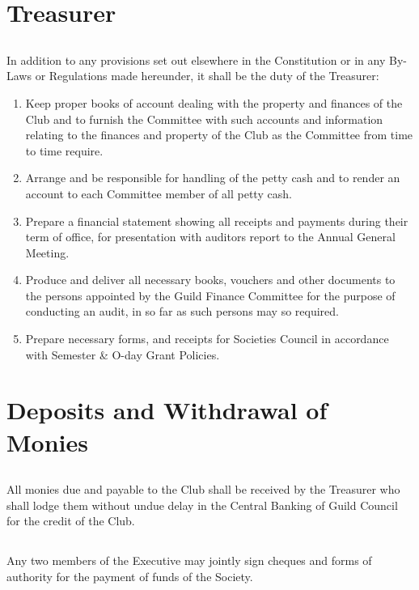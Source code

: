 \documentclass[10.5pt]{article}
\begin{document}
\section{Treasurer} 
\subsection{} In addition to any provisions set out elsewhere in the Constitution or in any By-Laws or Regulations made hereunder, it shall be the duty of the Treasurer: 
\begin{enumerate}[label=(\alph*)]
    \item Keep proper books of account dealing with the property and finances of the Club and to furnish the Committee with such accounts and information relating to the finances and property of the Club as the Committee from time to time require. 
    \item Arrange and be responsible for handling of the petty cash and to render an account to each Committee member of all petty cash. 
    \item Prepare a financial statement showing all receipts and payments during their term of office, for presentation with auditors report to the Annual General Meeting. 
    \item Produce and deliver all necessary books, vouchers and other documents to the persons appointed by the Guild Finance Committee for the purpose of conducting an audit, in so far as such persons may so required. 
    \item Prepare necessary forms, and receipts for Societies Council in accordance with Semester \& O-day Grant Policies.
    \newline
\end{enumerate}


\section{Deposits and Withdrawal of Monies}
\subsection{} All monies due and payable to the Club shall be received by the Treasurer who shall lodge them without undue delay in the Central Banking of Guild Council for the credit of the Club. 
\subsection{} Any two members of the Executive may jointly sign cheques and forms of authority for the payment of funds of the Society. 
\end{document}

